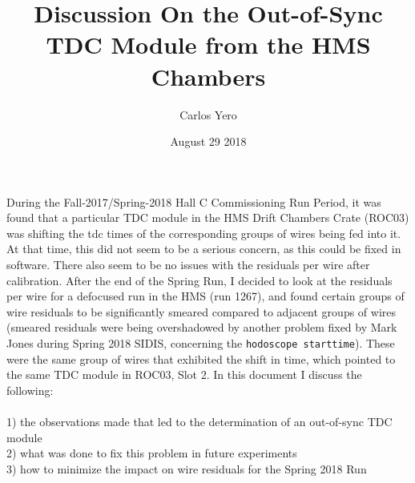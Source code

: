 \documentclass[11pt]{article}
\title{\textbf{Discussion On the Out-of-Sync TDC Module from the HMS Chambers}}
\author{Carlos Yero}
\date{August 29 2018}
\begin{document}
\maketitle



\noindent During the Fall-2017/Spring-2018 Hall C Commissioning Run Period, it was found that a particular TDC module in the HMS
Drift Chambers Crate (ROC03) was shifting the tdc times of the corresponding groups of wires being fed into it. At that time,
this did not seem to be a serious concern, as this could be fixed in software. There also seem to be no issues with the
residuals per wire after calibration. After the end of the Spring Run, I decided to look at the residuals per wire for a defocused
run in the HMS (run 1267), and found certain groups of wire residuals to be significantly smeared compared to adjacent groups of wires (smeared
residuals were being overshadowed by another problem fixed by Mark Jones during Spring 2018 SIDIS, concerning the \texttt{hodoscope starttime}).
These were the same group of wires that exhibited the shift in time, which pointed to the same TDC module in ROC03, Slot 2.
In this document I discuss the following: \\
\\
1) the observations made that led to the determination of an out-of-sync TDC module \\
2) what was done to fix this problem in future experiments \\
3) how to minimize the impact on wire residuals for the Spring 2018 Run
\end{document}
